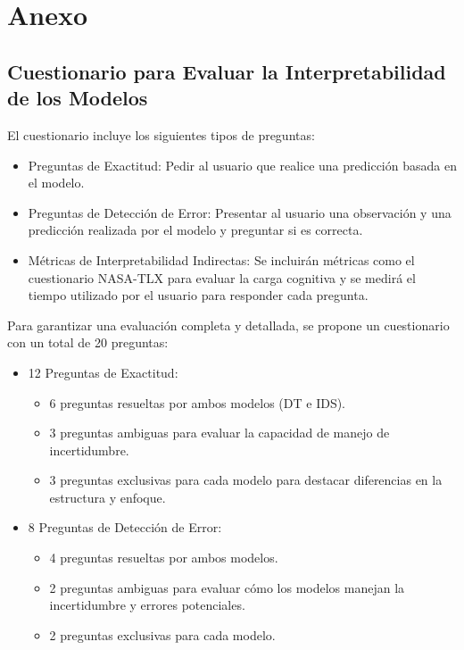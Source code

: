 \chapter*{Anexo}

\section*{Cuestionario para Evaluar la Interpretabilidad de los Modelos}

El cuestionario incluye los siguientes tipos de preguntas:
\begin{itemize}
    \item Preguntas de Exactitud: Pedir al usuario que realice una predicción basada en el modelo.
    \item Preguntas de Detección de Error: Presentar al usuario una observación y una predicción realizada por el modelo y preguntar si es correcta.
    \item Métricas de Interpretabilidad Indirectas: Se incluirán métricas como el cuestionario NASA-TLX para evaluar la carga cognitiva y se medirá el tiempo utilizado por el usuario para responder cada pregunta.
\end{itemize}

Para garantizar una evaluación completa y detallada, se propone un cuestionario con un total de 20 preguntas:
\begin{itemize}
    \item 12 Preguntas de Exactitud:
    \begin{itemize}
        \item 6 preguntas resueltas por ambos modelos (DT e IDS).
        \item 3 preguntas ambiguas para evaluar la capacidad de manejo de incertidumbre.
        \item 3 preguntas exclusivas para cada modelo para destacar diferencias en la estructura y enfoque.
    \end{itemize}
    \item 8 Preguntas de Detección de Error:
    \begin{itemize}
        \item 4 preguntas resueltas por ambos modelos.
        \item 2 preguntas ambiguas para evaluar cómo los modelos manejan la incertidumbre y errores potenciales.
        \item 2 preguntas exclusivas para cada modelo.
    \end{itemize}
\end{itemize}

